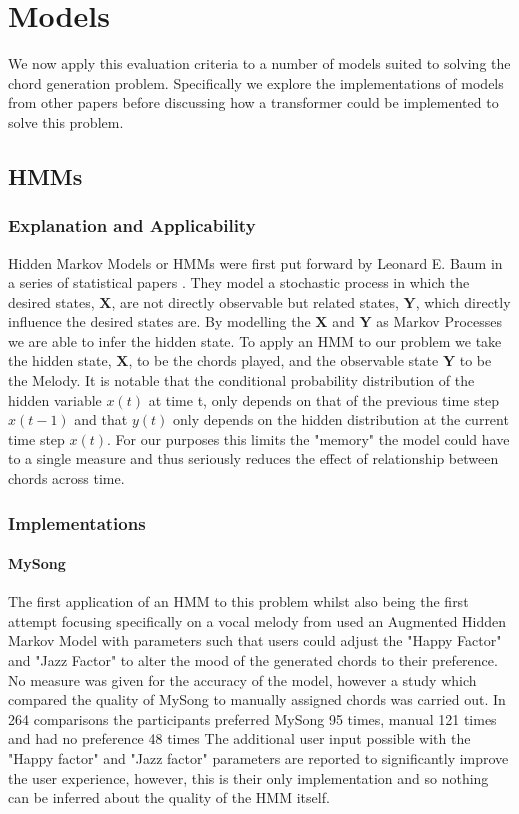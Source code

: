 \section{Models}

We now apply this evaluation criteria to a number of models suited to solving the chord generation problem. 
Specifically we explore the implementations of models from other papers before discussing how a transformer could be implemented to solve this problem.

\subsection{HMMs}
\label{subsec:HMM}
\subsubsection{Explanation and Applicability}
Hidden Markov Models or HMMs were first put forward by Leonard E. Baum in a series of statistical papers \cite{HMM1} \cite{HMM2} \cite{HMM3}. 
They model a stochastic process in which the desired states, $\boldsymbol{X}$, are not directly observable but related states, $\boldsymbol{Y}$, which directly influence the desired states are. 
By modelling the $\boldsymbol{X}$ and $\boldsymbol{Y}$ as Markov Processes 
we are able to infer the hidden state.
To apply an HMM to our problem we take the hidden state, $\boldsymbol{X}$, to be the chords played, and the observable state $\boldsymbol{Y}$ to be the Melody.
It is notable that the conditional probability distribution of the hidden variable $x(t)$ at time t, only depends on that of the previous time step $x(t-1)$ and that $y(t)$ only depends on the hidden distribution at the current time step $x(t)$.
For our purposes this limits the "memory" the model could have to a single measure and thus seriously reduces the effect of relationship between chords across time.

\subsubsection{Implementations}

\paragraph{MySong} The first application of an HMM to this problem whilst also being the first attempt focusing specifically on a vocal melody from \cite{MySong} used an Augmented Hidden Markov Model with parameters such that users could adjust the "Happy Factor" and "Jazz Factor" to alter the mood of the generated chords to their preference.
No measure was given for the accuracy of the model, however a study which compared the quality of MySong to manually assigned chords was carried out. 
In 264 comparisons the participants preferred MySong 95 times, manual 121 times and had no preference 48 times
The additional user input possible with the "Happy factor" and "Jazz factor" parameters are reported to significantly improve the user experience, however, this is their only implementation and so nothing can be inferred about the quality of the HMM itself.


